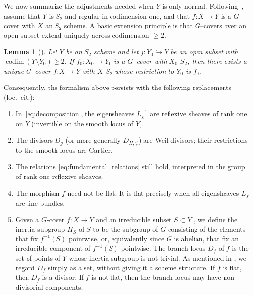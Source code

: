 \documentclass[12pt,twoside,]{amsart}
\theoremstyle{plain}
\newtheorem{lemma}[theorem]{Lemma}
\theoremstyle{definition}
\begin{document}

We now summarize the adjustments needed when $Y$ is only normal. Following~\cite{AP12}, assume that $Y$ is $S_2$
and regular in codimension one, and that $f\colon X\to Y$ is a $G$--cover with $X$ an $S_2$ scheme. A basic extension principle is that $G$--covers over an open subset extend uniquely across codimension $\ge2$.
\begin{lemma}[{\cite[Lem.~1.2]{AP12}}]\label{lem:AP_extension}
Let $Y$ be an $S_2$ scheme and let $j\colon Y_0\hookrightarrow Y$ be an open subset with $\operatorname{codim}(Y\setminus Y_0)\ge2$.
If $f_0\colon X_0\to Y_0$ is a $G$--cover with $X_0$ $S_2$, then there exists a unique $G$--cover $f\colon X\to Y$
with $X$ $S_2$ whose restriction to $Y_0$ is $f_0$.
\end{lemma}

Consequently, the formalism above persists with the following replacements (loc.\ cit.):
\begin{enumerate}
\item In~\eqref{eq:decomposition}, the eigensheaves $L_\chi^{-1}$ are reflexive sheaves of rank one on $Y$
(invertible on the smooth locus of $Y$).
\item The divisors $D_g$ (or more generally $D_{H,\psi}$) are Weil divisors; their restrictions to the smooth locus are Cartier.
\item The relations~\eqref{eq:fundamental_relations}  still hold, interpreted in the
group of rank-one reflexive sheaves.
\item The morphism $f$ need not be flat. It is flat precisely when all eigensheaves $L_\chi$ are line bundles.
\item Given a $G$-cover $f : X \to Y$ and an irreducible subset $S \subset Y$ , we define the inertia subgroup $H_S$ of $S$ to be the subgroup of $G$ consisting of the elements that fix $f^{-1}(S)$ pointwise, or, equivalently since $G$ is abelian, that fix an irreducible component of $f^{-1}(S)$ pointwise. The branch locus $D_f$ of $f$ is the set of points of $Y$ whose inertia subgroup is not trivial. As mentioned in \cite{AP12},  we regard $D_f$ simply as a set, without giving it a scheme structure. If $f$ is flat, then $D_f$ is a divisor. If $f$ is not flat, then the branch locus may have non-divisorial components.
\end{enumerate}
\end{document}
